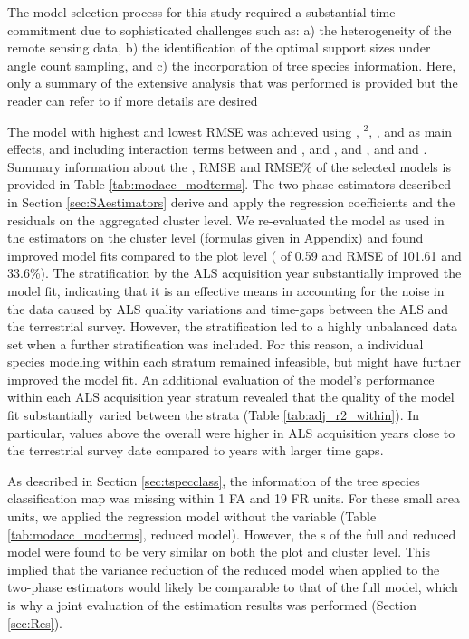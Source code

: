 The model selection process for this study required a substantial time commitment due to sophisticated challenges such as: a) the heterogeneity of the remote sensing data, b) the identification of the optimal support sizes under angle count sampling, and c) the incorporation of tree species information. Here, only a summary of the extensive analysis that was performed is provided but the reader can refer to \citet{hill2017a} if more details are desired\par
The model with highest \adjrsq{} and lowest RMSE was achieved using \meanheight{}, \meanheight{}$^2$, \stddev{}, \alsyear{} and \treespecies{} as main effects, and including interaction terms between \meanheight{} and \alsyear{}, \stddev{} and \alsyear{}, \meanheight{} and \stddev{}, and \meanheight{} and \treespecies{}. Summary information about the \adjrsq{}, RMSE and RMSE\% of the selected models is provided in Table \ref{tab:modacc_modterms}. The two-phase estimators described in Section \ref{sec:SAestimators} derive and apply the regression coefficients and the residuals on the aggregated cluster level. We re-evaluated the model as used in the estimators on the cluster level (formulas given in Appendix) and found improved model fits compared to the plot level (\adjrsq{} of 0.59 and RMSE of 101.61 \mha{} and 33.6\%). The stratification by the ALS acquisition year substantially improved the model fit, indicating that it is an effective means in accounting for the noise in the data caused by ALS quality variations and time-gaps between the ALS and the terrestrial survey. However, the stratification led to a highly unbalanced data set when a further \treespecies{} stratification was included. For this reason, a individual species modeling within each \alsyear{} stratum remained infeasible, but might have further improved the model fit. An additional evaluation of the model's performance within each ALS acquisition year stratum revealed that the quality of the model fit substantially varied between the strata (Table \ref{tab:adj_r2_within}). In particular, values above the overall \adjrsq{} were higher in ALS acquisition years close to the terrestrial survey date compared to years with larger time gaps.\par
As described in Section \ref{sec:tspecclass}, the information of the tree species classification map was missing within 1 FA and 19 FR units. For these small area units, we applied the regression model without the \treespecies{} variable (Table \ref{tab:modacc_modterms}, reduced model). However, the \adjrsq{}s of the full and reduced model were found to be very similar on both the plot and cluster level. This implied that the variance reduction of the reduced model when applied to the two-phase estimators would likely be comparable to that of the full model, which is why a joint evaluation of the estimation results was performed (Section \ref{sec:Res}).

